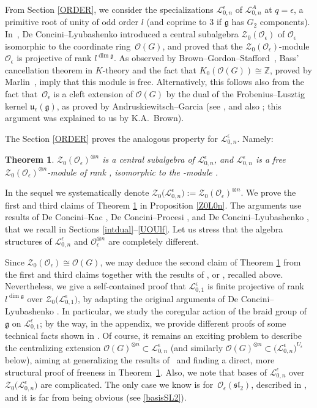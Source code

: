 \documentclass[10pt,a4paper]{amsart}
\numberwithin{equation}{section}
\newtheorem{teo}{Theorem}[section]
\theoremstyle{definition}
\newcommand{\e}{\epsilon}
\newcommand{\mz}{\mathbb{Z}}
\newcommand{\Ll}{{\mathcal L}}
\newcommand{\Oo}{{\mathcal O}}
\begin{document}
From Section \ref{ORDER}, we consider the specializations $\Ll_{0,n}^\e$ of $\Ll_{0,n}^A$ at $q=\e$, a primitive root of unity of odd order $l$ (and coprime to $3$ if $\mathfrak{g}$ has $G_2$ components). In~\cite{DC-L}, De Concini--Lyubashenko introduced a central subalgebra $\mathcal{Z}_0(\Oo_\e)$ of $\Oo_\e$ isomorphic to the coordinate ring~$\Oo(G)$, and proved that the $\mathcal{Z}_0(\Oo_\e)$-module $\Oo_\e$ is projective of rank $l^{\dim \mathfrak{g}}$. As observed by Brown--Gordon--Stafford~\cite{BGS}, Bass' cancellation theorem in $K$-theory and the fact that $K_0(\Oo(G))\cong \mz$, proved by Marlin~\cite{Marlin}, imply that this module is free. Alternatively, this follows also from the fact that~$\Oo_\e$ is a cleft extension of $\Oo(G)$ by the dual of the Frobenius--Lusztig kernel $\mathfrak{u}_\e(\mathfrak{g})$, as proved by Andruskiewitsch--Garcia (see \cite[Remark~2.18\,(b)]{AnGa}, and also \cite[Section~3.2]{BC}; this argument was explained to us by K.A.~Brown).


The Section \ref{ORDER} proves the analogous property for $\Ll_{0,n}^\e$. Namely:
\begin{teo}\label{Llibre} $\mathcal{Z}_0(\Oo_\e)^{\otimes n}$ is a central subalgebra of $\Ll_{0,n}^\e$, and $\Ll_{0,n}^\e$ is a free $\mathcal{Z}_0(\Oo_\e)^{\otimes n}$-module of rank , isomorphic to the \smash{$\mathcal{Z}_0(\Oo_\e)^{\otimes n}$}-module \smash{$\Oo_\e^{\otimes n}$}.
\end{teo}
In the sequel we systematically denote $\mathcal{Z}_0\bigl(\Ll_{0,n}^\e\bigr):= \mathcal{Z}_0(\Oo_\e)^{\otimes n}$.
We prove the first and third claims of Theorem \ref{Llibre} in Proposition \ref{Z0L0n}. The arguments use results of De Concini--Kac \cite{DC-K}, De Concini--Procesi \cite{DC-K-P1,DC-K-P2}, and De Concini--Lyubashenko \cite{DC-L}, that we recall in Sections \ref{intdual}--\ref{UOUlf}. Let us stress that the algebra structures of $\Ll_{0,n}^\e$ and $\Oo_\e^{\otimes n}$ are completely different.

Since $\mathcal{Z}_0(\Oo_\e)\cong \Oo(G)$, we may deduce the second claim of Theorem \ref{Llibre} from the first and third claims together with the results of \cite{DC-L,Marlin}, or \cite{AnGa}, recalled above. Nevertheless, we give a self-contained proof that $\Ll_{0,1}^\e$ is finite projective of rank $l^{\dim \mathfrak{g}}$ over $\mathcal{Z}_0\bigl(\Ll_{0,1}^\e\bigr)$, by adapting the original arguments of De Concini--Lyubashenko \cite[Theorem~7.2]{DC-L}. In particular, we study the coregular action of the braid group of $\mathfrak{g}$ on $\Ll_{0,1}^\e$; by the way, in the appendix, we provide different proofs of some technical facts shown in \cite{DC-L}. Of course, it remains an exciting problem to describe the centralizing extension $\mathcal{O}(G)^{\otimes n} \subset \Ll_{0,n}^\e$ (and similarly $\mathcal{O}(G)^{\otimes n} \subset \bigl(\Ll_{0,n}^\e\bigr)^{U_\e}$ below), aiming at generalizing the results of~\cite{AnGa} and finding a direct, more structural proof of freeness in Theorem~\ref{Llibre}.
Also, we note that bases of $\Ll_{0,n}^\e$ over $\mathcal{Z}_0\bigl(\Ll_{0,n}^\e\bigr)$ are complicated. The only case we know is for~$\Oo_\e({\mathfrak{sl}_2})$, described in \cite{DRZ}, and it is far from being obvious (see \eqref{basisSL2}).
\end{document}
